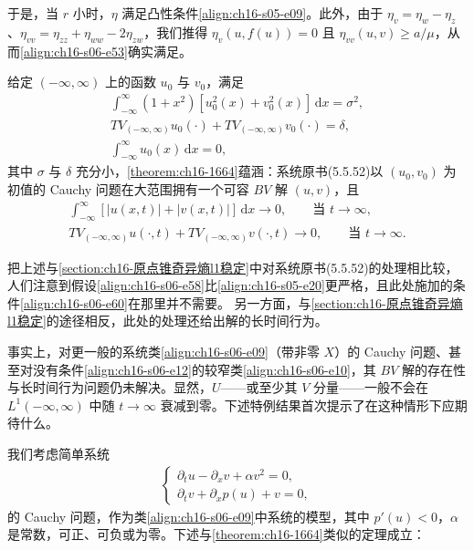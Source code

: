 \documentclass[../../main.tex]{subfiles}
\begin{document}
于是，当 $r$ 小时，$\eta$ 满足凸性条件\eqref{align:ch16-s05-e09}。此外，由于 $\eta_v=\eta_w-\eta_z$、$\eta_{vv}=\eta_{zz}+\eta_{ww}-2\eta_{zw}$，我们推得 $\eta_v(u,f(u))=0$ 且 $\eta_{vv}(u,v)\geqslant a/\mu$，从而\eqref{align:ch16-s06-e53}确实满足。

给定 $(-\infty,\infty)$ 上的函数 $u_0$ 与 $v_0$，满足
\begin{align}
\int_{-\infty}^{\infty}(1+x^2)[u_0^2(x)+v_0^2(x)]\,\mathrm{d}x=\sigma^2,
\label{align:ch16-s06-e58}\\
TV_{(-\infty,\infty)}u_0(\cdot)+TV_{(-\infty,\infty)}v_0(\cdot)=\delta,
\label{align:ch16-s06-e59}\\
\int_{-\infty}^{\infty}u_0(x)\,\mathrm{d}x=0,
\label{align:ch16-s06-e60}
\end{align}
其中 $\sigma$ 与 $\delta$ 充分小，\cref{theorem:ch16-1664}蕴涵：系统原书(5.5.52)以 $(u_0,v_0)$ 为初值的 Cauchy 问题在大范围拥有一个可容 $BV$ 解 $(u,v)$，且
\begin{align}
\int_{-\infty}^{\infty}[|u(x,t)|+|v(x,t)|]\,\mathrm{d}x\to0,\qquad\text{当 }t\to\infty,
\label{align:ch16-s06-e61}\\
TV_{(-\infty,\infty)}u(\cdot,t)+TV_{(-\infty,\infty)}v(\cdot,t)\to0,\qquad\text{当 }t\to\infty.
\label{align:ch16-s06-e62}
\end{align}

把上述与\cref{section:ch16-原点锥奇异熵l1稳定}中对系统原书(5.5.52)的处理相比较，人们注意到假设\eqref{align:ch16-s06-e58}比\eqref{align:ch16-s05-e20}更严格，且此处施加的条件\eqref{align:ch16-s06-e60}在那里并不需要。
另一方面，与\cref{section:ch16-原点锥奇异熵l1稳定}的途径相反，此处的处理还给出解的长时间行为。

事实上，对更一般的系统类\eqref{align:ch16-s06-e09}（带非零 $X$）的 Cauchy 问题、甚至对没有条件\eqref{align:ch16-s06-e12}的较窄类\eqref{align:ch16-s06-e10}，其 $BV$ 解的存在性与长时间行为问题仍未解决。显然，$U$——或至少其 $V$ 分量——一般不会在 $L^1(-\infty,\infty)$ 中随 $t\to\infty$ 衰减到零。下述特例结果首次提示了在这种情形下应期待什么。

我们考虑简单系统
\begin{align}
\begin{cases}
\partial_tu-\partial_xv+\alpha v^2=0,\\
\partial_tv+\partial_xp(u)+v=0,
\end{cases}
\label{align:ch16-s06-e63}
\end{align}
的 Cauchy 问题，作为类\eqref{align:ch16-s06-e09}中系统的模型，其中 $p'(u)<0$，$\alpha$ 是常数，可正、可负或为零。下述与\cref{theorem:ch16-1664}类似的定理成立：
\end{document}
